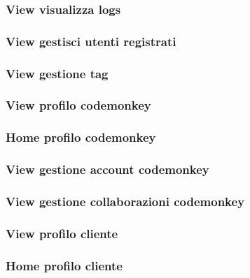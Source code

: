 \documentclass{article}
\begin{document}
\subsubsection{View visualizza logs}

\subsubsection{View gestisci utenti registrati}

\subsubsection{View gestione tag}

\subsubsection{View profilo codemonkey}

\subsubsection{Home profilo codemonkey}

\subsubsection{View gestione account codemonkey}

\subsubsection{View gestione collaborazioni codemonkey}

\subsubsection{View profilo cliente}

\subsubsection{Home profilo cliente}

\end{document}
